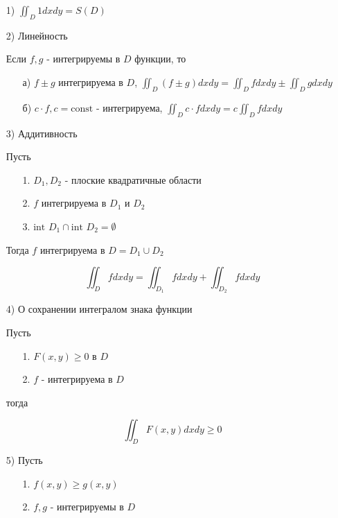 \documentclass[a4paper, 14pt]{report}
\begin{document}
	\begin{enumerate}
		\item[1)] $\iint_D 1 dxdy = S(D)$
		\item[2)] Линейность 
		
		Если $f,g$ - интегрируемы в $D$ функции, то 
		
		\begin{enumerate}
			\item[а)] $f \pm g$ интегрируема в $D$, $\iint_D (f \pm g) dxdy = \iint_D fdxdy \pm \iint_D g dxdy$
			\item[б)] $c \cdot f, c = \text{const}$ - интегрируема, $\iint_D c \cdot f dxdy = c \iint_D f dxdy$
		\end{enumerate}
		
		\item[3)] Аддитивность
		
		Пусть
		
		\begin{enumerate}
			\item[1.] $D_1,D_2$ - плоские квадратичные области
			\item[2.] $f$ интегрируема в $D_1$ и $D_2$
			\item[3.] $\text{int } D_1 \cap \text{int } D_2 = \emptyset$
		\end{enumerate}
		
		Тогда $f$ интегрируема в $D= D_1 \cup D_2$
		
		$$ \iint_D f dxdy = \iint_{D_1} f dxdy + \iint_{D_2} f dxdy $$
		
		\item[4)] О сохранении интегралом знака функции
		
		Пусть
		
		\begin{enumerate}
			\item[1.] $F(x,y) \geq 0$ в $D$
			\item[2.] $f$ - интегрируема в $D$
		\end{enumerate}
		
		тогда 
		
		$$ \iint_D F(x,y) dxdy \geq 0 $$
		
		\item[5)] Пусть
		
			\begin{enumerate}
			\item[1.] $ f(x,y) \geq g(x,y) $
			\item[2.] $ f,g $ - интегрируемы в $D$
		\end{enumerate}
		

\end{enumerate}
\end{document}
